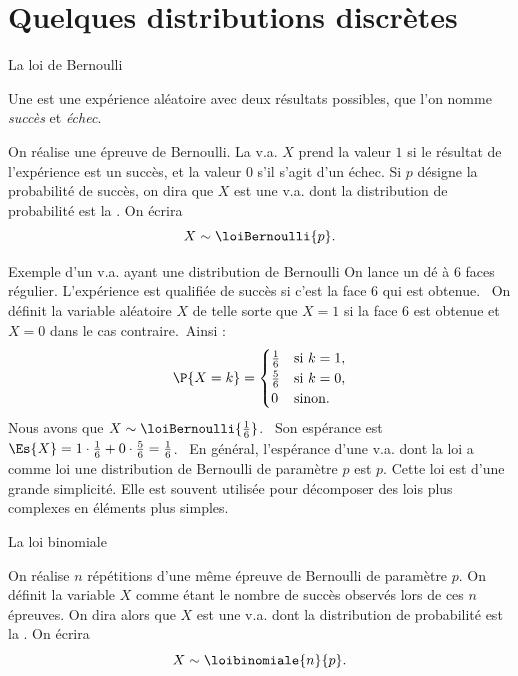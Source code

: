 \documentclass[nuit,charter,pied]{BeamerJS}
\begin{document}
\section{Quelques distributions discrètes}

\begin{frame}{La loi de Bernoulli}
	
	\begin{defn}
		Une  est une expérience aléatoire avec deux résultats possibles, que l'on nomme \textit{succès} et \textit{échec}.
	\end{defn}\pause
	\begin{defn}
		On réalise une épreuve de Bernoulli. La v.a. $X$ prend la valeur $1$ si le résultat de l'expérience est un succès, et la valeur $0$ s'il s'agit d'un échec. Si $p$ désigne la probabilité de succès, on dira que $X$ est une v.a. dont la distribution de probabilité est la . On écrira
		\[X\sim \loiBernoulli{p}.\]
	\end{defn}
\end{frame}
\begin{frame}{Exemple d'un v.a. ayant une distribution de Bernoulli}
	On lance un dé à $6$ faces régulier. L'expérience est qualifiée de succès si c'est la face $6$ qui est obtenue.\pause~ On définit la variable aléatoire $X$ de telle sorte que $X=1$ si la face $6$ est obtenue et $X=0$ dans le cas contraire.~\pause Ainsi :
	\begin{displaymath}
		\P{X=k}=\begin{cases}
			\frac{1}{6} &\text{si $k=1$},\\
			\frac{5}{6} &\text{si $k=0$},\\
			0 &\text{sinon}.
		\end{cases}
	\end{displaymath}\pause
Nous avons que $X\sim \loiBernoulli{\frac{1}{6}}$.\pause~ Son espérance est $\Es{X}=1\cdot\frac{1}{6}+0\cdot\frac{5}{6}=\frac{1}{6}$.\pause~ En général, l'espérance d'une v.a. dont la loi a comme loi une distribution de Bernoulli de paramètre $p$ est $p$. Cette loi est d'une grande simplicité. Elle est souvent utilisée pour décomposer des lois plus complexes en éléments plus simples.
\end{frame}	
\begin{frame}{La loi binomiale}
	
	\begin{defn}
		On réalise $n$ répétitions d'une même épreuve de Bernoulli de paramètre $p$. On définit la variable $X$ comme étant le nombre de succès observés lors de ces $n$ épreuves. On dira alors que $X$ est une v.a. dont la distribution de probabilité est la . On écrira
		\[X\sim \loibinomiale{n}{p}.\]
	\end{defn}
\end{frame}
\end{document}
